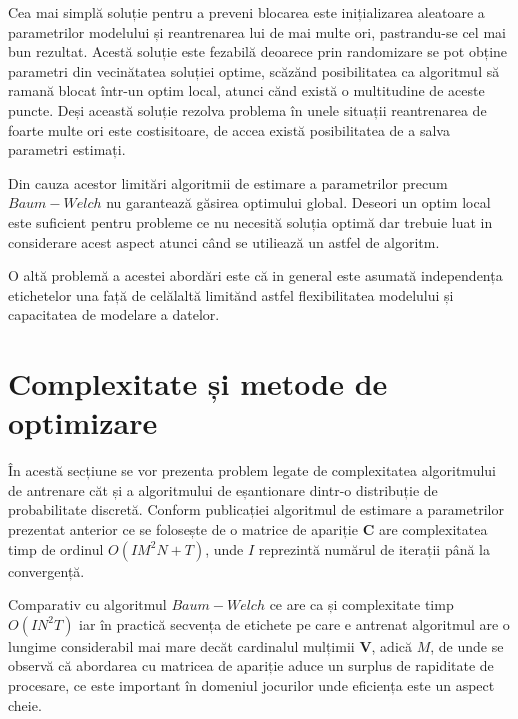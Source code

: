 Cea mai simplă soluție pentru a preveni blocarea este inițializarea aleatoare a parametrilor modelului și reantrenarea lui de mai multe ori, pastrandu-se cel mai bun rezultat. Acestă soluție este fezabilă deoarece prin randomizare se pot obține parametri din vecinătatea soluției optime, scăzănd posibilitatea ca algoritmul să ramană blocat într-un optim local, atunci cănd există o multitudine de aceste puncte. Deși această soluție rezolva problema în unele situații reantrenarea de foarte multe ori este costisitoare, de accea există posibilitatea de a salva parametri estimați.\par

Din cauza acestor limitări algoritmii de estimare a parametrilor precum $Baum-Welch$ nu garantează găsirea optimului global. Deseori un optim local este suficient pentru probleme ce nu necesită soluția optimă dar trebuie luat in considerare acest aspect atunci când se utiliează un astfel de algoritm.\par

O altă problemă a acestei abordări este că in general este asumată independența etichetelor una față de celălaltă limitănd astfel flexibilitatea modelului și capacitatea de modelare a datelor.\par

\section{Complexitate și metode de optimizare}

În acestă secțiune se vor prezenta problem legate de complexitatea algoritmului de antrenare căt și a algoritmului de eșantionare dintr-o distribuție de probabilitate discretă. Conform publicației algoritmul de estimare a parametrilor prezentat anterior ce se folosește de o matrice de apariție \textbf{C} are complexitatea timp de ordinul $O(IM^{2}N+T)$, unde $I$ reprezintă numărul de iterații până la convergență.\par

Comparativ cu algoritmul $Baum-Welch$ ce are ca și complexitate timp $O(IN^{2}T)$ iar în practică secvența de etichete pe care e antrenat algoritmul are o lungime considerabil mai mare decăt cardinalul mulțimii \textbf{V}, adică $M$, de unde se observă că abordarea cu matricea de apariție aduce un surplus de rapiditate de procesare, ce este important în domeniul jocurilor unde eficiența este un aspect cheie.\par

